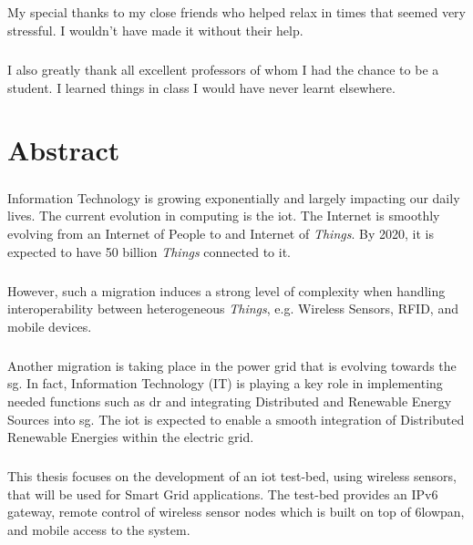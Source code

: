 \documentclass[12pt,a4paper,final]{report}
\begin{document}
\paragraph{}
My special thanks to my close friends who helped relax in times that seemed very stressful. I wouldn't have made it without their help.
\paragraph{}
I also greatly thank all excellent professors of whom I had the chance to be a student. I learned things in class  I would have never learnt elsewhere.


\chapter*{Abstract}
\paragraph{}
Information Technology is growing exponentially and largely impacting our daily lives. The current evolution in computing is the \gls{iot}. The Internet is smoothly evolving from an Internet of People to and Internet of \textit{Things}. By 2020, it is expected to have 50 billion \textit{Things} connected to it. 
\paragraph{}
However, such a migration induces a strong level of complexity when handling interoperability between heterogeneous \textit{Things}, e.g. Wireless Sensors, RFID, and mobile devices.
\paragraph{}
Another migration is taking place in the power grid that is evolving towards the \gls{sg}. In fact, Information Technology (IT) is playing a key role in implementing needed functions such as \gls{dr} and integrating Distributed and Renewable Energy Sources into \gls{sg}. The \gls{iot} is expected to enable a smooth integration of Distributed Renewable Energies within the electric grid.
\paragraph{}
This thesis focuses on the development of an \gls{iot} test-bed, using wireless sensors, that will be used for Smart Grid applications. The test-bed provides an IPv6 gateway, remote control of wireless sensor nodes which is built on top of \gls{6lowpan}, and mobile access to the system.
\end{document}
